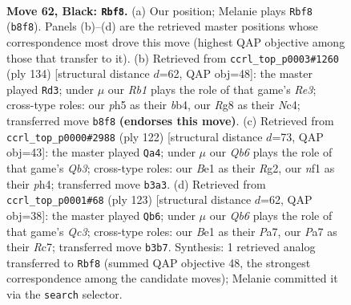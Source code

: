 \documentclass[11pt]{article}
\begin{document}
\clearpage

\begin{figure}[p]\centering
\begin{subfigure}{0.46\textwidth}\centering
\resizebox{\linewidth}{!}{%
\newchessgame
\chessboard[
  setfen={1r4r1/p5p1/4Q2p/k2p3P/p2P2P1/1q2P3/6K1/4bN2 b - - 33 62},
  showmover=false,
  pgfstyle=straightmove, color=movearrow, markmove={b8-f8}
]}
\caption{}
\end{subfigure}\hfill
\begin{subfigure}{0.46\textwidth}\centering
\resizebox{\linewidth}{!}{%
\newchessgame
\chessboard[
  setfen={4r3/6kp/2p1q1p1/8/PbN1PP2/1P2RQ2/3p2K1/8 w - - 0 68},
  showmover=false,
  pgfstyle=straightmove, color=movearrow, markmove={e3-d3}
]}
\caption{}
\end{subfigure}
\\[4pt]
\begin{subfigure}{0.46\textwidth}\centering
\resizebox{\linewidth}{!}{%
\newchessgame
\chessboard[
  setfen={b7/p4k2/P2q2p1/2pPrp2/7p/1Q3P1P/6R1/3R2K1 w - - 2 62},
  showmover=false,
  pgfstyle=straightmove, color=movearrow, markmove={b3-a4}
]}
\caption{}
\end{subfigure}\hfill
\begin{subfigure}{0.46\textwidth}\centering
\resizebox{\linewidth}{!}{%
\newchessgame
\chessboard[
  setfen={8/p1r1k1p1/P1q2p2/7P/4P3/3Q2P1/2p2P2/2R3K1 b - - 0 62},
  showmover=false,
  pgfstyle=straightmove, color=movearrow, markmove={c6-b6}
]}
\caption{}
\end{subfigure}
\caption{\textbf{Move 62, Black: \texttt{Rbf8}.} (a) Our position; Melanie plays \texttt{Rbf8} (\texttt{b8f8}). Panels (b)--(d) are the retrieved master positions whose correspondence most drove this move (highest QAP objective among those that transfer to it). (b) Retrieved from \texttt{ccrl\_top\_p0003\#1260} (ply 134) [structural distance $d$=62, QAP obj=48]: the master played \texttt{Rd3}; under $\mu$ our \emph{Rb1} plays the role of that game's \emph{Re3}; cross-type roles: our \emph{p}h5 as their \emph{b}b4, our \emph{R}g8 as their \emph{N}c4; transferred move \texttt{b8f8} \textbf{(endorses this move)}. (c) Retrieved from \texttt{ccrl\_top\_p0000\#2988} (ply 122) [structural distance $d$=73, QAP obj=43]: the master played \texttt{Qa4}; under $\mu$ our \emph{Qb6} plays the role of that game's \emph{Qb3}; cross-type roles: our \emph{B}e1 as their \emph{R}g2, our \emph{n}f1 as their \emph{p}h4; transferred move \texttt{b3a3}. (d) Retrieved from \texttt{ccrl\_top\_p0001\#68} (ply 123) [structural distance $d$=62, QAP obj=38]: the master played \texttt{Qb6}; under $\mu$ our \emph{Qb6} plays the role of that game's \emph{Qc3}; cross-type roles: our \emph{B}e1 as their \emph{P}a7, our \emph{P}a7 as their \emph{R}c7; transferred move \texttt{b3b7}. Synthesis: 1 retrieved analog transferred to \texttt{Rbf8} (summed QAP objective 48, the strongest correspondence among the candidate moves); Melanie committed it via the \texttt{search} selector.}
\label{fig:thought-m123}
\end{figure}
\end{document}
